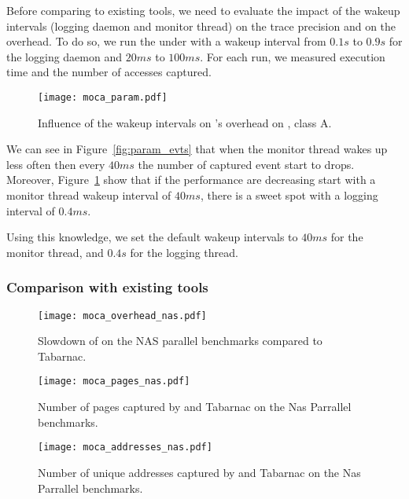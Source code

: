 Before comparing \Moca to existing tools, we need to evaluate the impact of
the wakeup intervals (logging daemon and monitor thread) on the trace
precision and on the overhead. To do so, we run the \FT under \Moca with
a wakeup interval from $0.1s$ to  $0.9s$ for the logging daemon and $20ms$ to
$100ms$. For each run, we measured \FT execution time and the number of
accesses captured.

\begin{figure}[htb]
    \centering
    \texttt{[image: moca\_param.pdf]}
    \caption{Influence of the wakeup intervals on \Moca's overhead on
        \FT, class A.}
    \label{fig:param}
\end{figure}

We can see in Figure~\ref{fig:param_evts} that when the monitor thread wakes
up less often then every $40ms$ the number of captured event start to drops.
Moreover, Figure~\ref{fig:param} show that if the performance are decreasing
start with a monitor thread wakeup interval of $40ms$, there is a sweet spot
with a logging interval of $0.4ms$.

Using this knowledge, we set the default wakeup intervals to $40ms$ for the
monitor thread, and $0.4s$ for the logging thread.

\subsubsection{Comparison with existing tools}

\begin{figure}[htb]
    \centering
    \texttt{[image: moca\_overhead\_nas.pdf]}
    \caption{Slowdown of \Moca on the NAS parallel benchmarks compared to
    Tabarnac.}
    \label{fig:ovh}
\end{figure}

\begin{figure}[htb]
    \centering
    \texttt{[image: moca\_pages\_nas.pdf]}
    \caption{Number of pages captured by \Moca and Tabarnac on the Nas
    Parrallel benchmarks.}
    \label{fig:pages}
\end{figure}

\begin{figure}[htb]
    \centering
    \texttt{[image: moca\_addresses\_nas.pdf]}
    \caption{Number of unique addresses captured by \Moca and Tabarnac on the Nas
    Parrallel benchmarks.}
    \label{fig:addr}
\end{figure}

